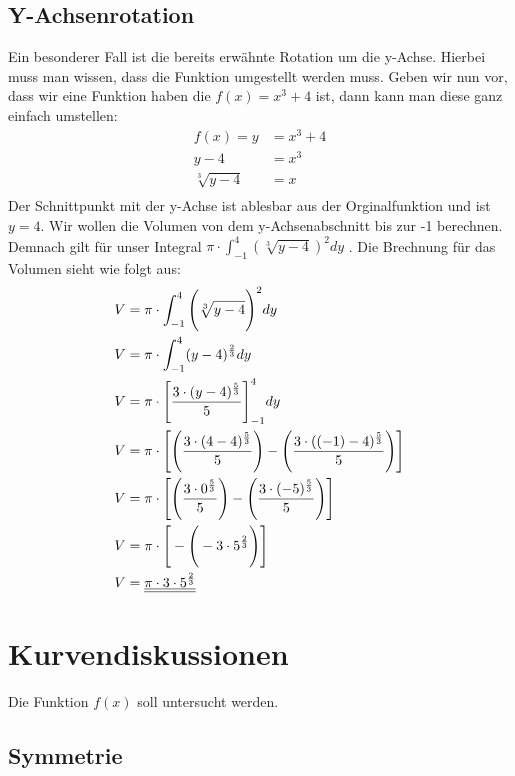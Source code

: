 \documentclass[a4paper,12pt]{article}
\begin{document}
\subsection{Y-Achsenrotation}
Ein besonderer Fall ist die bereits erwähnte Rotation um die y-Achse. Hierbei muss man wissen, dass die Funktion umgestellt werden muss.
Geben wir nun vor, dass wir eine Funktion haben die $f(x) = x^3 + 4$ ist, dann kann man diese ganz einfach umstellen:
\begin{equation}
\begin{split}
f(x) = y & = x^3 + 4\\
y - 4 & = x^3\\
\sqrt[3]{y - 4} & = x\\
\end{split}
\end{equation}
Der Schnittpunkt mit der y-Achse ist ablesbar aus der Orginalfunktion und ist $y = 4$.
Wir wollen die Volumen von dem y-Achsenabschnitt bis zur -1 berechnen. Demnach gilt für unser Integral $\pi \cdot \int_{-1}^{4} (\sqrt[3]{y - 4})^2 dy$ .
Die Brechnung für das Volumen sieht wie folgt aus:
\begin{equation}
\begin{split}
V & = \pi \cdot \int_{-1}^{4} \Bigg{(}\sqrt[3]{y - 4}\Bigg{)}^2 dy\\
V & = \pi \cdot \int_{-1}^{4} (y - 4)^{\frac{2}{3}} dy\\
V & = \pi \cdot \Bigg{[} \frac{3\cdot(y-4)^\frac{5}{3}}{5}\Bigg{]}_{-1}^{4} dy\\
V & = \pi \cdot \Bigg{[} \Bigg{(} \frac{3\cdot(4-4)^\frac{5}{3}}{5}\Bigg{)} - \Bigg{(} \frac{3\cdot((-1)-4)^\frac{5}{3}}{5}\Bigg{)} \Bigg{]}\\
V & = \pi \cdot \Bigg{[} \Bigg{(} \frac{3\cdot0^\frac{5}{3}}{5}\Bigg{)} - \Bigg{(} \frac{3\cdot(-5)^\frac{5}{3}}{5}\Bigg{)} \Bigg{]}\\
V & = \pi \cdot \Bigg{[} - \Bigg{(} -3\cdot5^\frac{2}{3}\Bigg{)} \Bigg{]}\\
V & = \underline{\underline{\pi \cdot 3 \cdot 5^\frac{2}{3}}}
\end{split}
\end{equation}
\pagebreak
\section{Kurvendiskussionen}
Die Funktion $f(x)$ soll untersucht werden.
\subsection{Symmetrie}
\end{document}
